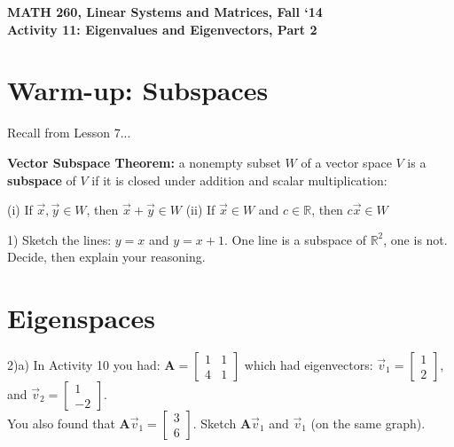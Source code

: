 \documentclass{article}
\begin{document}
\begin{flushleft}
	\bfseries{MATH 260, Linear Systems and Matrices, Fall `14}\\
	\bfseries{Activity 11:  Eigenvalues and Eigenvectors, Part 2}\\
\begin{flushleft}

\section*{Warm-up:  Subspaces}
Recall from Lesson 7...

\vspace{0.1in}

\textbf{Vector Subspace Theorem:} a nonempty subset $W$ of a vector space $V$ is a \textbf{subspace} of $V$ if it is closed under addition and scalar multiplication:

\vspace{0.2in}

(i) If $\vec{x},\vec{y}\in W$, then $\vec{x}+\vec{y}\in W$ \hspace{0.5in} (ii) If $\vec{x}\in W$ and $c\in \mathbb{R}$, then $c\vec{x} \in W$

\vspace{0.2in}

1) Sketch the lines: $y=x$ and $ y=x+1$.  One line is a subspace of $\mathbb{R}^2$, one is not. Decide, then explain your reasoning.

\vspace{1.5in}

\newpage

\section*{Eigenspaces}

2)a) In Activity 10 you had:
$\textbf{A}=
\begin{bmatrix} 
1 & 1 \\ 4&1 
\end{bmatrix}$
 which had eigenvectors:
$\vec{v}_1=\begin{bmatrix} 1 \\ 2 \end{bmatrix}$,
and $\vec{v}_2=\begin{bmatrix} 1 \\ -2 \end{bmatrix}$. \\
\hspace{0.12in} You also found that $\textbf{A}\vec{v}_1 = \begin{bmatrix} 3 \\ 6 \end{bmatrix}$. Sketch $\textbf{A}\vec{v}_1$ and $\vec{v}_1$ (on the same graph).


\end{flushleft}
\end{flushleft}
\end{document}
